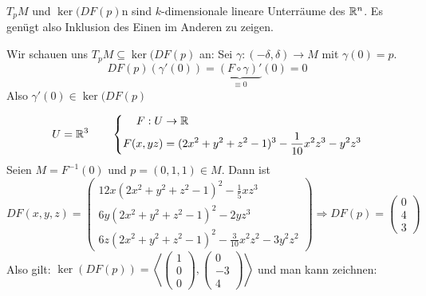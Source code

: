 \documentclass[main.tex]{subfiles}
\begin{document}
\begin{Beweis}
  $T_p M$ und $\ker(DF(p)$n sind $k$-dimensionale lineare Unterräume des $\mathbb{R}^n$. Es genügt also Inklusion des Einen im Anderen zu zeigen.

  Wir schauen uns $T_p M \subseteq \ker(DF(p)$ an: Sei $\gamma:(-\delta,\delta) \to M$ mit $\gamma(0) = p$.
  $$DF(p)(\gamma'(0)) = \underbrace{(F \circ \gamma)'}_{\equiv 0}(0) = 0$$
  Also $\gamma'(0) \in \ker(DF(p)$
\end{Beweis}

\begin{Beispiel}
  $$U = \mathbb{R}^3 \qquad \left\{\begin{aligned}
    F: U & \to \mathbb{R} \\
    F(x,yz) & = (2x^2 + y^2 + z^2 - 1)^3 - \frac{1}{10}x^2 z^3 - y^2z^3
  \end{aligned}\right.$$
  Seien $M = F^{-1}(0)$ und $p = (0,1,1) \in M$. Dann ist
  $$DF(x,y,z) = \begin{pmatrix}
      12x(2x^2 + y^2 + z^2 -1)^2 - \frac{1}{5}xz^3 \\
      6y(2x^2 + y^2 + z^2 -1)^2 - 2 yz^3 \\
      6z(2x^2 + y^2 +z^2 -1)^2 - \frac{3}{10}x^2z^2 - 3y^2z^2
    \end{pmatrix} \Rightarrow DF(p) = \begin{pmatrix}
      0 \\ 4 \\ 3
    \end{pmatrix}$$
  Also gilt: $\ker(DF(p)) = \left<\begin{pmatrix}
    1 \\ 0 \\ 0
  \end{pmatrix}, \begin{pmatrix}
    0 \\ -3 \\ 4
  \end{pmatrix} \right>$ und man kann zeichnen:


\end{Beispiel}
\end{document}
